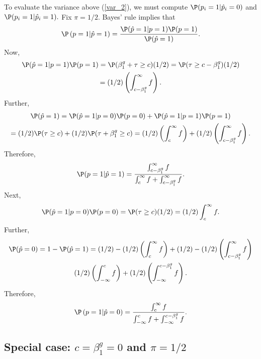 \documentclass[12pt]{article}
\begin{document}
To evaluate the variance above (\ref{var_2}), we must compute $\P(p_i = 1 | \hat{p}_i = 0)$ and $\P(p_i = 1 | \hat{p}_i = 1).$ Fix $\pi = 1/2$. Bayes' rule implies that 
$$\P\left( p = 1 | \hat{p} = 1 \right) = \frac{ \P( \hat{p} = 1 | p = 1) \P( p = 1 )}{\P( \hat{p} = 1)}.$$
Now,
\begin{multline*} \P(\hat{p} = 1 | p = 1) \P(p=1) =  \P( \beta_1^g + \tau \geq c ) (1/2) = \P( \tau \geq c - \beta^g_1 )(1/2) \\ = (1/2) \left(\int_{c - \beta^g_1}^\infty f\right).
\end{multline*}
Further,
\begin{multline*}
\P( \hat{p} = 1) = \P( \hat{p} = 1 | p = 0) \P(p = 0) + \P(\hat{p} = 1 | p = 1) \P(p = 1) \\ = (1/2) \P( \tau \geq c) + (1/2) \P( \tau + \beta^g_1 \geq c) = (1/2) \left( \int_{c}^\infty  f \right) + (1/2) \left(\int_{c - \beta_1^g}^\infty f\right).
\end{multline*}
Therefore,
\begin{equation}\label{cond_phat1}
\P(p = 1 | \hat{p} = 1) = \frac{ \int_{c - \beta^g_1}^\infty f }{ \int_c^\infty f + \int_{c - \beta^g_1}^\infty f}.
\end{equation}
Next, $$\P(\hat{p} = 1 | p = 0)\P(p = 0) = \P( \tau \geq c )(1/2)  = (1/2) \int_c^\infty f.$$
Further,
\begin{multline*}
\P( \hat{p} = 0) = 1 - \P(\hat{p} = 1) = (1/2) - (1/2) \left( \int_c^\infty f \right) + (1/2) - (1/2) \left( \int_{c - \beta_1^g}^\infty f \right) \\ (1/2) \left( \int_{-\infty}^c f \right) + (1/2) \left( \int_{-\infty}^{c - \beta_1^g} f \right).
\end{multline*}
Therefore,
$$\P\left( p = 1 | \hat{p} = 0 \right) = \frac{ \int_{c}^{\infty} f }{ \int_{-\infty}^c f + \int_{-\infty}^{c - \beta_1^g} f}.$$
\subsection{Special case: $c = \beta_1^g = 0$ and $\pi = 1/2$}
\end{document}
